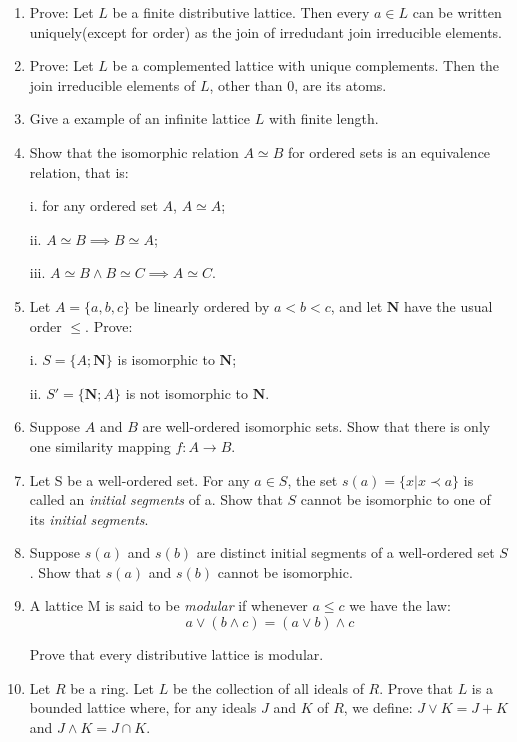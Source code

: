 \documentclass{article}
\begin{document}
\begin{enumerate}
  \item Prove: Let $L$ be a finite distributive lattice.
  Then every $a\in L$ can be written uniquely(except for order)
  as the join of irredudant join irreducible elements.

  \item Prove: Let $L$ be a complemented lattice with unique complements.
  Then the join irreducible elements of $L$, other than $0$, are its atoms.

  \item Give a example of an infinite lattice $L$ with finite length.

  \item Show that the isomorphic relation $A\simeq B$ for ordered sets is an equivalence relation, that is:

  i. for any ordered set $A$, $A\simeq A$;

  ii. $A\simeq B \implies B\simeq A$;

  iii. $A\simeq B \land B\simeq C \implies A\simeq C$.

  \item Let $A = \{a, b, c\}$ be linearly ordered by $a < b < c$,
  and let $\mathbf{N}$ have the usual order $\leq$. Prove:

  i. $S = \{A; \mathbf{N}\}$ is isomorphic to $\mathbf{N}$;

  ii. $S' = \{\mathbf{N}; A\}$ is not isomorphic to $\mathbf{N}$.

  \item Suppose $A$ and $B$ are well-ordered isomorphic sets.
  Show that there is only one similarity mapping $f: A\to B$.

  \item Let S be a well-ordered set. For any $a \in S$, the set $s(a) = \{x | x\prec a\}$
  is called an \textsl{initial segments} of a. Show that $S$ cannot be isomorphic to one of
  its \textsl{initial segments}.

  \item Suppose $s(a)$ and $s(b)$ are distinct initial segments of a well-ordered set $S$.
  Show that $s(a)$ and $s(b)$ cannot be isomorphic.

  \item A lattice M is said to be \textsl{modular} if whenever $a \leq c$ we have the law:
  $$
  a \lor (b \land c) = (a \lor b) \land c
  $$

  Prove that every distributive lattice is modular.

  \item Let $R$ be a ring. Let $L$ be the collection of all ideals of $R$.
  Prove that $L$ is a bounded lattice where, for any ideals $J$ and $K$ of $R$,
  we define: $J \lor K = J + K$ and $J \land K = J \cap K$.
\end{enumerate}
\end{document}
